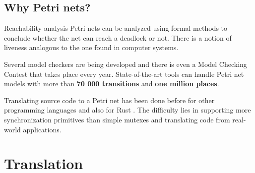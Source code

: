 \documentclass{beamer}
\begin{document}
\subsection{Why Petri nets?}

\begin{frame}{Reachability analysis}
  Petri nets can be analyzed using formal methods to conclude whether the net can reach
  a deadlock or not. There is a notion of liveness analogous to the one found in computer systems.

  \vfill
  \pause

  Several model checkers are being developed and
  there is even a Model Checking Contest that takes place every year.
  State-of-the-art tools can handle Petri net models
  with more than \textbf{70 000 transitions} and \textbf{one million places}.

  \vfill
  \pause

  Translating source code to a Petri net has been done before for other programming languages
  \cite{kavi2002modeling,moshtaghi2001} and also for Rust \cite{meyer2020, zhang2022deadlocks}.
  The difficulty lies in supporting more synchronization primitives
  than simple mutexes and translating code from real-world applications.
\end{frame}

\section{Translation}
\end{document}
